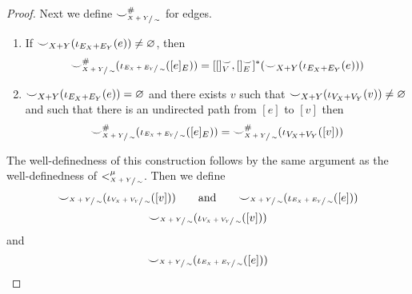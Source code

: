 \begin{proof}
    Next we define ${\smile}_{\sfrac{X+Y}{\sim}}^{{\#}}$ for edges.

    \begin{enumerate}
        \item If ${\smile}_{X+Y}(\iota_{E_{X} + E_{Y}}(e)) \not = \varnothing$, then
                \begin{align*}
                    {\smile}_{\sfrac{X+Y}{\sim}}^{{\#}}(\iota_{\sfrac{E_{X} + E_{Y}}{\sim}}([e]_{E})) =
                    [[]_{V}^{{\smile}}, []_{E}^{{\smile}}]^{*}({\smile}_{X+Y}(\iota_{E_{X} + E_{Y}}(e)))
                \end{align*}
        \item ${\smile}_{X+Y}(\iota_{E_{X} + E_{Y}}(e)) = \varnothing$ and there exists $v$ such that ${\smile}_{X+Y}(\iota_{V_{X} + V_{Y}}(v)) \not = \varnothing$ and such that there is an undirected path from $[e]$ to $[v]$
        then
        \[
            {\smile}_{\sfrac{X+Y}{\sim}}^{{\#}}(\iota_{\sfrac{E_{X} + E_{Y}}{\sim}}([e]_{E})) = {\smile}_{\sfrac{X+Y}{\sim}}^{{\#}}(\iota_{V_{X} + V_{Y}}([v]))
        \]
    \end{enumerate}
    
    The well-definedness of this construction follows by the same argument as the well-definedness of $<_{\sfrac{X+Y}{\sim}}^{\mu}$.
    Then we define
    \ifdefined \ONECOLUMN
    \[
        {\smile}_{\sfrac{X+Y}{\sim}}(\iota_{\sfrac{V_{X} + V_{Y}}{\sim}}([v])) \qquad \text{and} \qquad {\smile}_{\sfrac{X+Y}{\sim}}(\iota_{\sfrac{E_{X} + E_{Y}}{\sim}}([e]))
    \]
    \else
    \[
        {\smile}_{\sfrac{X+Y}{\sim}}(\iota_{\sfrac{V_{X} + V_{Y}}{\sim}}([v]))
    \]
    and
    \[
        {\smile}_{\sfrac{X+Y}{\sim}}(\iota_{\sfrac{E_{X} + E_{Y}}{\sim}}([e]))
    \]
    \fi


\end{proof}
